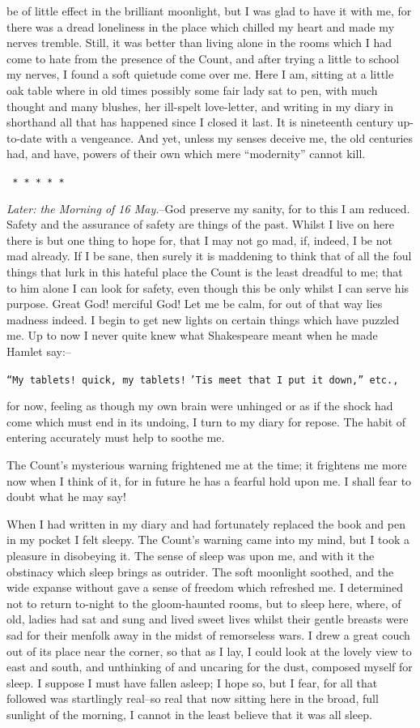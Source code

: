 \documentclass[12pt,openright]{book}
\begin{document}
be of little effect in the brilliant moonlight, but I was glad to have it with me, for there was a dread loneliness in the place which chilled my heart and made my nerves tremble. Still, it was better than living alone in the rooms which I had come to hate from the presence of the Count, and after trying a little to school my nerves, I found a soft quietude come over me. Here I am, sitting at a little oak table where in old times possibly some fair lady sat to pen, with much thought and many blushes, her ill-spelt love-letter, and writing in my diary in shorthand all that has happened since I closed it last. It is nineteenth century up-to-date with a vengeance. And yet, unless my senses deceive me, the old centuries had, and have, powers of their own which mere “modernity” cannot kill.

\texttt{   *       *       *       *       *}

\textit{Later: the Morning of 16 May.}–God preserve my sanity, for to this I am reduced. Safety and the assurance of safety are things of the past. Whilst I live on here there is but one thing to hope for, that I may not go mad, if, indeed, I be not mad already. If I be sane, then surely it is maddening to think that of all the foul things that lurk in this hateful place the Count is the least dreadful to me; that to him alone I can look for safety, even though this be only whilst I can serve his purpose. Great God! merciful God! Let me be calm, for out of that way lies madness indeed. I begin to get new lights on certain things which have puzzled me. Up to now I never quite knew what Shakespeare meant when he made Hamlet say:–

\texttt{“My tablets! quick, my tablets!}
\texttt{’Tis meet that I put it down,” etc.,}

for now, feeling as though my own brain were unhinged or as if the shock had come which must end in its undoing, I turn to my diary for repose. The habit of entering accurately must help to soothe me.

The Count’s mysterious warning frightened me at the time; it frightens me more now when I think of it, for in future he has a fearful hold upon me. I shall fear to doubt what he may say!

When I had written in my diary and had fortunately replaced the book and pen in my pocket I felt sleepy. The Count’s warning came into my mind, but I took a pleasure in disobeying it. The sense of sleep was upon me, and with it the obstinacy which sleep brings as outrider. The soft moonlight soothed, and the wide expanse without gave a sense of freedom which refreshed me. I determined not to return to-night to the gloom-haunted rooms, but to sleep here, where, of old, ladies had sat and sung and lived sweet lives whilst their gentle breasts were sad for their menfolk away in the midst of remorseless wars. I drew a great couch out of its place near the corner, so that as I lay, I could look at the lovely view to east and south, and unthinking of and uncaring for the dust, composed myself for sleep. I suppose I must have fallen asleep; I hope so, but I fear, for all that followed was startlingly real–so real that now sitting here in the broad, full sunlight of the morning, I cannot in the least believe that it was all sleep.
\end{document}
